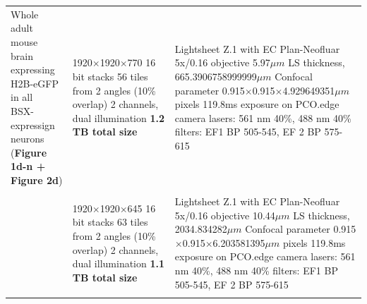 \documentclass[]{spie}  %
\begin{document}
\begin{landscape}
{\begin{longtable}{lll}
                                         \multirowcell{2}[-4ex][l]{Whole adult mouse brain \\expressing H2B-eGFP in all \\BSX-expressign neurons\\(\textbf{Figure 1d-n + Figure 2d})} &             \makecell[l]{1920$\times$1920$\times$770 16 bit stacks\\56 tiles from 2 angles (10\% overlap) \\2 channels, dual illumination\\\textbf{1.2 TB total size}}  &                                                               \makecell[l]{Lightsheet Z.1 with EC Plan-Neofluar 5x/0.16 objective \\5.97$\mu{}m$ LS thickness, 665.3906758999999$\mu{}m$ Confocal parameter\\0.915$\times$0.915$\times$4.929649351$\mu{}m$ pixels\\119.8ms exposure on PCO.edge camera\\lasers: 561 nm 40\%, 488 nm 40\%\\filters: EF1 BP 505-545, EF 2 BP 575-615} \\ \\
                                                                                                                                   
         &    \makecell[l]{1920$\times$1920$\times$645 16 bit stacks\\63 tiles from 2 angles (10\% overlap) \\2 channels, dual illumination\\\textbf{1.1 TB total size}}  &                                                                    \makecell[l]{Lightsheet Z.1 with EC Plan-Neofluar 5x/0.16 objective \\10.44$\mu{}m$ LS thickness, 2034.834282$\mu{}m$ Confocal parameter\\0.915$\times$0.915$\times$6.203581395$\mu{}m$ pixels\\119.8ms exposure on PCO.edge camera\\lasers: 561 nm 40\%, 488 nm 40\%\\filters: EF1 BP 505-545, EF 2 BP 575-615} \\ \\


\end{longtable}}
\end{landscape}
\end{document}
